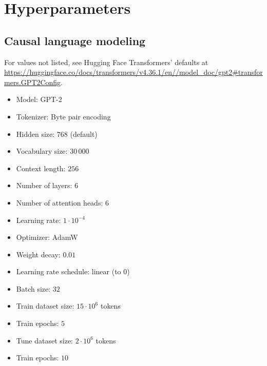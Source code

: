 \section{Hyperparameters}
\unskip\label{sec:hparams}

\subsection{Causal language modeling}
\unskip\label{sec:hparams-clm}

For values not listed, see Hugging Face Transformers' defaults at \url{https://huggingface.co/docs/transformers/v4.36.1/en//model_doc/gpt2\#transformers.GPT2Config}.
\begin{itemize}[itemsep=-1.2ex]
  \item Model: GPT-2
  \item Tokenizer: Byte pair encoding
  \item Hidden size: $768$ (default)
  \item Vocabulary size: $30\,000$
  \item Context length: $256$
  \item Number of layers: $6$
  \item Number of attention heads: $6$
  \item Learning rate: $1\cdot10^{-4}$
  \item Optimizer: AdamW
  \item Weight decay: $0.01$
  \item Learning rate schedule: linear (to $0$)
  \item Batch size: $32$
  \item Train dataset size: $15\cdot10^6$ tokens
  \item Train epochs: $5$
  \item Tune dataset size: $2\cdot10^6$ tokens
  \item Train epochs: $10$
\end{itemize}


